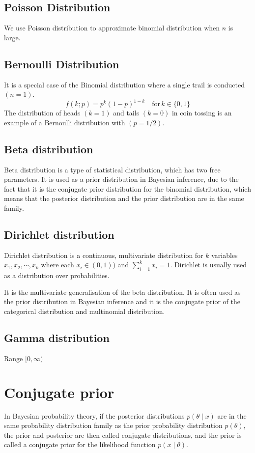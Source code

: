 \documentclass{article}
\begin{document}
\subsection{Poisson Distribution}
We use Poisson distribution to approximate binomial distribution when $n$ is large.

\subsection{Bernoulli Distribution}
It is a special case of the Binomial distribution where a single trail is conducted $(n=1)$.
\[f(k;p) = p^k(1-p)^{1-k} \quad \text{for} \, k \in \{0,1\}\]
The distribution of heads $(k=1)$ and tails $(k=0)$ in coin tossing is an example of a Bernoulli distribution with $(p=1/2)$.

\subsection{Beta distribution}
Beta distribution is a type of statistical distribution, which has two free parameters. It is used as a prior distribution in Bayesian inference, due to the fact that it is the conjugate prior distribution for the binomial distribution, which means that the posterior distribution and the prior distribution are in the same family.

\subsection{Dirichlet distribution}
Dirichlet distribution is a continuous, multivariate distribution for $k$
variables $x_1,x_2,\cdots, x_k$ where each $x_i \in (0,1)$) and $\sum_{i=1}^{k} x_i = 1$. 
Dirichlet is usually used as a distribution over probabilities.

It is the multivariate generalisation of the beta distribution. It is often used as the prior distribution in Bayesian inference and it is the conjugate prior of the categorical distribution and multinomial distribution.

\subsection{Gamma distribution}
Range $[0,\infty)$


\section{Conjugate prior}
In Bayesian probability theory, if the posterior distributions $p(\theta \mid x)$ are in the same probability distribution family as the prior probability distribution $p(\theta)$, the prior and posterior are then called conjugate distributions, and the prior is called a conjugate prior for the likelihood function $p(x \mid \theta)$.
\end{document}
